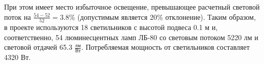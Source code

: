 При этом имеет место избыточное освещение, превышающее расчетный световой поток на $\frac{54-52}{52} = 3.8$\% (допустимым является 20\% отклонение).
Таким образом, в проекте используются 18 светильников с высотой подвеса 0.1 м и, соответственно, 54 люминесцентных ламп ЛБ-80 со световым потоком 5220 лм и световой отдачей 65.3 $\frac{\text{лм}}{\text{Вт}}$. Потребляемая мощность от светильников составляет 4320 Вт.
